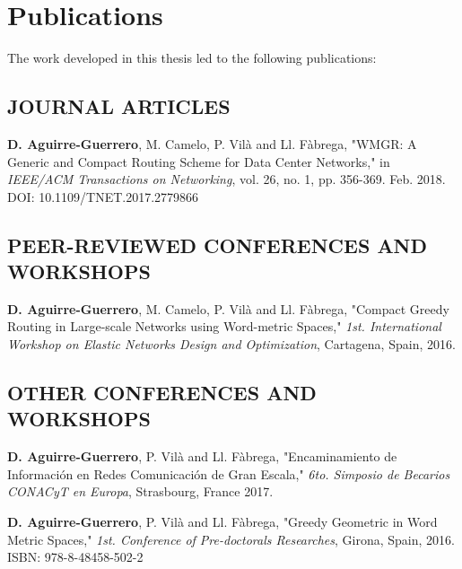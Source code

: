 \chapter*{Publications}%
\label{sec:publications}

The work developed in this thesis led to the following publications:

\section*{JOURNAL ARTICLES}
\begin{enumerate}[{[1]}]
  \item \textbf{D. Aguirre-Guerrero}, M. Camelo, P. Vil\`a and Ll. F\`abrega, 
  "WMGR: A Generic and Compact Routing Scheme for Data Center Networks," in
  \textit{IEEE/ACM Transactions on Networking}, vol. 26, no. 1, pp. 356-369. Feb. 2018.
  DOI: 10.1109/TNET.2017.2779866
\end{enumerate}

\section*{PEER-REVIEWED CONFERENCES AND WORKSHOPS}
\begin{enumerate}[{[1]}]
  \item \textbf{D. Aguirre-Guerrero}, M. Camelo, P. Vil\`a and Ll. F\`abrega, 
  "Compact Greedy Routing in Large-scale Networks using Word-metric Spaces,"
  \textit{1st. International Workshop on Elastic Networks Design and Optimization},
  Cartagena, Spain, 2016.
\end{enumerate}


\section*{OTHER CONFERENCES AND WORKSHOPS}

\begin{enumerate}[label={[\arabic*]}]
  \item \textbf{D. Aguirre-Guerrero}, P. Vil\`a and Ll. F\`abrega, 
  "Encaminamiento de Informaci{\'o}n en Redes Comunicaci{\'o}n de Gran Escala,"
  \textit{6to. Simposio de Becarios CONACyT en Europa}, Strasbourg, France 2017.
  \item \textbf{D. Aguirre-Guerrero}, P. Vil\`a and Ll. F\`abrega, 
  "Greedy Geometric in Word Metric Spaces,"
  \textit{1st. Conference of Pre-doctorals Researches}, Girona, Spain, 2016. 
  ISBN: 978-8-48458-502-2
\end{enumerate}
